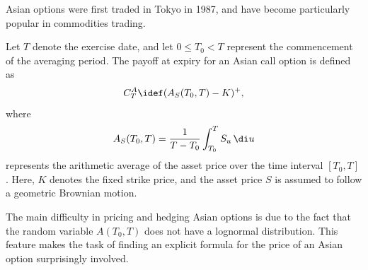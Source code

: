 Asian options were first traded in Tokyo in 1987, and have become particularly popular in commodities trading.

Let $T$ denote the exercise date, and let $0 \le T_0 < T$ represent the commencement of the averaging period. The payoff at expiry for an Asian call option is defined as
\begin{equation} \label{eq:AsianCallPayoff}
	C_T^A \idef (A_S(T_0, T) - K)^+,
\end{equation}
where
\begin{equation} \label{eq:ArithmeticAverage}
	A_S(T_0, T) = \frac{1}{T - T_0} \int_{T_0}^T S_u \, \di u
\end{equation}
represents the arithmetic average of the asset price over the time interval $[T_0, T]$. Here, $K$ denotes the fixed strike price, and the asset price $S$ is assumed to follow a geometric Brownian motion.

The main difficulty in pricing and hedging Asian options is due to the fact that the random variable $A(T_0, T)$ does not have a lognormal distribution. This feature makes the task of finding an explicit formula for the price of an Asian option surprisingly involved.

